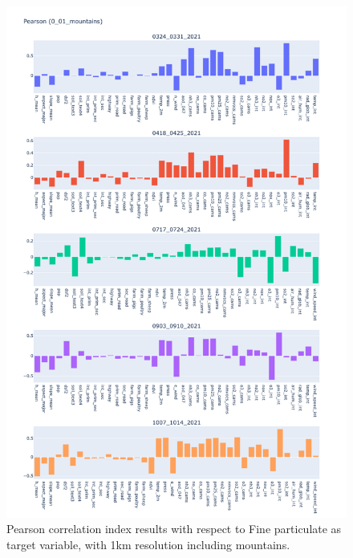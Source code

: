 \begin{figure}[H]
    \centering
    \includegraphics[scale=0.35]{images/tests/0_01_mountainspm25_st_pearson.png}
    \caption{Pearson correlation index results with respect to Fine particulate as target variable, with 1km resolution including mountains.}
    \label{fig:overview}
\end{figure}
